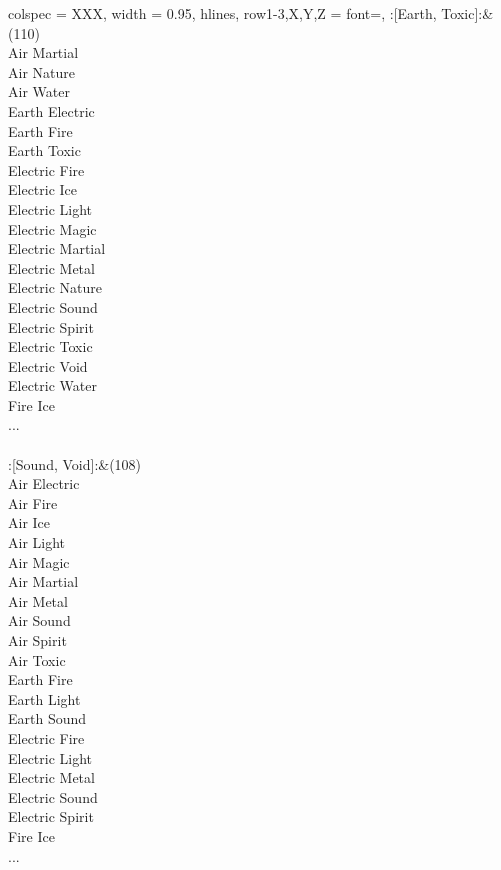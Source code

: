 \begin{longtblr}[
	caption = {2v2 Attacking Effective},
	label = {2v2-Attacking-Effective},
]{
	colspec = {XXX}, width = 0.95\linewidth,
	hlines,
	row{1-3,X,Y,Z} = {font=\bfseries},
}
	:[Earth, Toxic]:&{(110)\\
	Air Martial \\
	Air Nature \\
	Air Water \\
	Earth Electric \\
	Earth Fire \\
	Earth Toxic \\
	Electric Fire \\
	Electric Ice \\
	Electric Light \\
	Electric Magic \\
	Electric Martial \\
	Electric Metal \\
	Electric Nature \\
	Electric Sound \\
	Electric Spirit \\
	Electric Toxic \\
	Electric Void \\
	Electric Water \\
	Fire Ice \\
	...\\
	}\\

	:[Sound, Void]:&{(108)\\
	Air Electric \\
	Air Fire \\
	Air Ice \\
	Air Light \\
	Air Magic \\
	Air Martial \\
	Air Metal \\
	Air Sound \\
	Air Spirit \\
	Air Toxic \\
	Earth Fire \\
	Earth Light \\
	Earth Sound \\
	Electric Fire \\
	Electric Light \\
	Electric Metal \\
	Electric Sound \\
	Electric Spirit \\
	Fire Ice \\
	...\\
	}\\


\end{longtblr}
